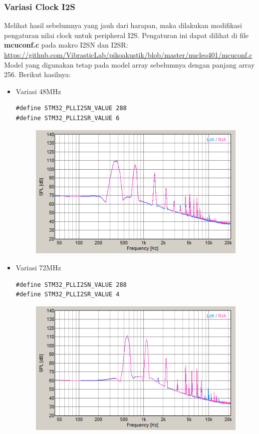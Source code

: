 \documentclass[12pt,]{article}
\begin{document}
  	\newpage
  	\subsubsection{Variasi Clock I2S}
  	Melihat hasil sebelumnya yang jauh dari harapan, maka dilakukan modifikasi
  	pengaturan nilai clock untuk peripheral I2S.
  	Pengaturan ini dapat dilihat di file \textbf{mcuconf.c} pada makro I2SN dan I2SR:\\
  	\url{https://github.com/VibrasticLab/pikoakustik/blob/master/nucleo401/mcuconf.c}\\
  	Model yang digunakan tetap pada model array sebelumnya dengan panjang array 256.
  	Berikut hasilnya:
  	\begin{itemize}
  		\item Variasi 48MHz
  		\begin{verbatim}
#define STM32_PLLI2SN_VALUE 288
#define STM32_PLLI2SR_VALUE 6
  		\end{verbatim}
  		\begin{figure}[H]
  			\centering
  			\includegraphics[width=0.45\linewidth]{result/day_2/sine_clk48}
  		\end{figure}

  		\item Variasi 72MHz
  		\begin{verbatim}
#define STM32_PLLI2SN_VALUE 288
#define STM32_PLLI2SR_VALUE 4
  		\end{verbatim}
  		\begin{figure}[H]
  			\centering
  			\includegraphics[width=0.45\linewidth]{result/day_2/sine_clk72}
  		\end{figure}


\end{itemize}
\end{document}
